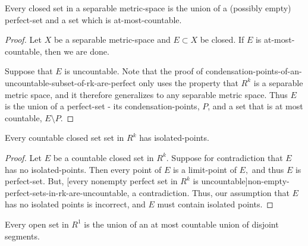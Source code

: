 \documentclass{article}
\begin{document}
\begin{theorem}\label{cantor-bendixson-theorem}
Every \@{closed} set in a \@{separable} \@{metric-space} is the union of a (possibly empty) \@{perfect-set} and a set which is \@{at-most-countable}.
\end{theorem}

\begin{proof}
Let $X$ be a \@{separable} \@{metric-space} and $E \subset X$ be \@{closed}. If $E$ is \@{at-most-countable}, then we are done.

Suppose that $E$ is \@{uncountable}. Note that the proof of \@{condensation-points-of-an-uncountable-subset-of-rk-are-perfect} only uses the property that $R^k$ is a separable metric space, and it therefore generalizes to any separable metric space. Thus $E$ is the union of a \@{perfect-set} - its \@{condensation-points}, $P$, and a set that is at most countable, $E \setminus P.$
\end{proof}

\begin{corollary}\label{countable-closed-set-has-isolated-points}
Every \@{countable} \@{closed} \@{set} set in $R^k$ has \@{isolated-points}.
\end{corollary}

\begin{proof}
Let $E$ be a \@{countable} \@{closed} set in $R^k.$ Suppose for contradiction that $E$ has no \@{isolated-points}. Then every point of $E$ is a \@{limit-point} of $E,$ and thus $E$ is \@{perfect-set}. But, \@[every nonempty perfect set in $R^k$ is uncountable]{non-empty-perfect-sets-in-rk-are-uncountable}, a contradiction. Thus, our assumption that $E$ has no isolated points is incorrect, and $E$ must contain isolated points.
\end{proof}

\begin{theorem}\label{open-set-in-r1-is-countable-union-of-disjoint-segments}
Every \@{open} set in $R^1$ is the union of an at most \@{countable} union of disjoint \@{segments}.
\end{theorem}
\end{document}
